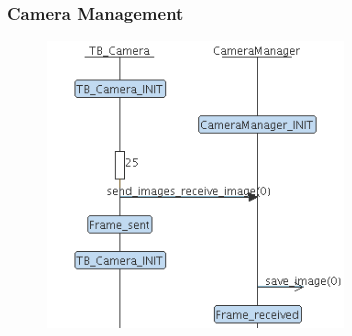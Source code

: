\documentclass{article}
\begin{document}
\subsubsection{Camera Management}
\label{subs:Light Management}
\begin{figure}[h!]
  \centering
  \includegraphics[width = 0.7\textwidth]{./camera_management.png}
\end{figure}
\newpage
\end{document}
